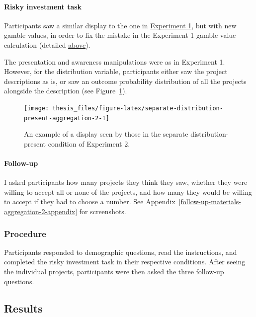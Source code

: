 \documentclass[a4paper, nobind, dvipsnames]{templates/ociamthesis}
\theoremstyle{definition}
\theoremstyle{definition}
\theoremstyle{definition}
\theoremstyle{definition}
\theoremstyle{remark}
\begin{document}
\hypertarget{task-aggregation-2}{%
\paragraph{Risky investment task}\label{task-aggregation-2}}

Participants saw a similar display to the one in
\protect\hyperlink{task-aggregation-1}{Experiment 1}, but with new gamble values, in order to fix
the mistake in the Experiment 1 gamble value calculation (detailed
\protect\hyperlink{outcome-distribution-aggregation-1}{above}).

The presentation and awareness manipulations were as in Experiment 1. However,
for the distribution variable, participants either saw the project descriptions
as is, or saw an outcome probability distribution of all the projects alongside
the description (see
Figure~\ref{fig:separate-distribution-present-aggregation-2}).



\begin{figure}
\texttt{[image: thesis\_files/figure-latex/separate-distribution-present-aggregation-2-1]} \caption{An example of a display seen by those in the separate distribution-present condition of Experiment 2.}\label{fig:separate-distribution-present-aggregation-2}
\end{figure}

\hypertarget{follow-up-aggregation-2}{%
\paragraph{Follow-up}\label{follow-up-aggregation-2}}

I asked participants how many projects they think they saw, whether they were
willing to accept all or none of the projects, and how many they would
be willing to accept if they had to choose a number. See
Appendix~\ref{follow-up-materials-aggregation-2-appendix} for screenshots.

\subsubsection{Procedure}

Participants responded to demographic questions, read the instructions, and
completed the risky investment task in their respective conditions. After seeing
the individual projects, participants were then asked the three follow-up
questions.

\hypertarget{results-aggregation-2}{%
\subsection{Results}\label{results-aggregation-2}}
\end{document}

